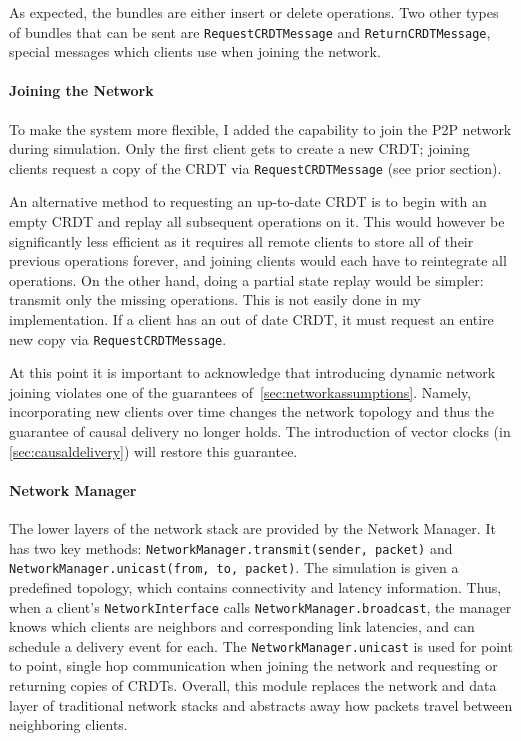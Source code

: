\documentclass[12pt,a4paper,twoside,openright]{report}
\begin{document}
		As expected, the bundles are either insert or delete operations. Two other types of bundles that can be sent are \lstinline|RequestCRDTMessage| and \lstinline|ReturnCRDTMessage|, special messages which clients use when joining the network.
		
		\paragraph{Joining the Network} \label{sec:networkjoin}
		To make the system more flexible, I added the capability to join the P2P network during simulation. Only the first client gets to create a new CRDT; joining clients request a copy of the CRDT via \lstinline|RequestCRDTMessage| (see prior section).
		
		An alternative method to requesting an up-to-date CRDT is to begin with an empty CRDT and replay all subsequent operations on it. This would however be significantly less efficient as it requires all remote clients to store all of their previous operations forever, and joining clients would each have to reintegrate all operations. On the other hand, doing a partial state replay would be simpler: transmit only the missing operations. This is not easily done in my implementation. If a client has an out of date CRDT, it must request an entire new copy via \lstinline|RequestCRDTMessage|.
		
		At this point it is important to acknowledge that introducing dynamic network joining violates one of the guarantees of~\cref{sec:networkassumptions}. Namely, incorporating new clients over time changes the network topology and thus the guarantee of causal delivery no longer holds. The introduction of vector clocks (in \cref{sec:causaldelivery}) will restore this guarantee.
		
		\paragraph{Network Manager}
		The lower layers of the network stack are provided by the Network Manager. It has two key methods: \lstinline|NetworkManager.transmit(sender, packet)| and \lstinline|NetworkManager.unicast(from, to, packet)|. The simulation is given a predefined topology, which contains connectivity and latency information. Thus, when a client's \lstinline|NetworkInterface| calls \lstinline|NetworkManager.broadcast|, the manager knows which clients are neighbors and corresponding link latencies, and can schedule a delivery event for each. The \lstinline|NetworkManager.unicast| is used for point to point, single hop communication when joining the network and requesting or returning copies of CRDTs. Overall, this module replaces the network and data layer of traditional network stacks and abstracts away how packets travel between neighboring clients.
		
\end{document}
